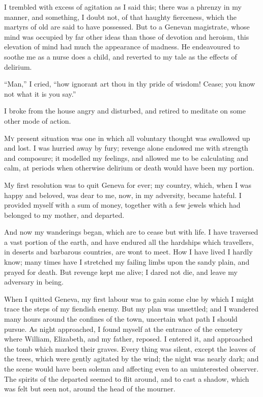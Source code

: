 I trembled with excess of agitation
as I said this; there was a phrenzy in
my manner, and something, I doubt
not, of that haughty fierceness, which
the martyrs of old are said to have possessed.
But to a Genevan magistrate,
whose mind was occupied by far other
ideas than those of devotion and
heroism, this elevation of mind had
much the appearance of madness. He
endeavoured to soothe me as a nurse
does a child, and reverted to my tale
as the effects of delirium.

``Man,'' I cried, ``how ignorant
art thou in thy pride of wisdom!
Cease; you know not what it is you
say.''

I broke from the house angry and
disturbed, and retired to meditate on
some other mode of action.


\textsc{My} present situation was one in
which all voluntary thought was swallowed
up and lost. I was hurried
away by fury; revenge alone endowed
me with strength and composure; it
modelled my feelings, and allowed me
to be calculating and calm, at periods
when otherwise delirium or death
would have been my portion.

My first resolution was to quit
Geneva for ever; my country, which,
when I was happy and beloved, was
dear to me, now, in my adversity, became
hateful. I provided myself with
a sum of money, together with a few
jewels which had belonged to my
mother, and departed.

And now my wanderings began,
which are to cease but with life. I
have traversed a vast portion of the
earth, and have endured all the hardships
which travellers, in deserts and
barbarous countries, are wont to meet.
How I have lived I hardly know; many
times have I stretched my failing limbs
upon the sandy plain, and prayed for
death. But revenge kept me alive; I
dared not die, and leave my adversary
in being.

When I quitted Geneva, my first
labour was to gain some clue by which
I might trace the steps of my fiendish
enemy. But my plan was unsettled;
and I wandered many hours around
the confines of the town, uncertain
what path I should pursue. As night
approached, I found myself at the entrance
of the cemetery where William,
Elizabeth, and my father, reposed.
I entered it, and approached
the tomb which marked their graves.
Every thing was silent, except the
leaves of the trees, which were gently
agitated by the wind; the night was
nearly dark; and the scene would have
been solemn and affecting even to an
uninterested observer. The spirits of
the departed seemed to flit around, and
to cast a shadow, which was felt but
seen not, around the head of the
mourner.

